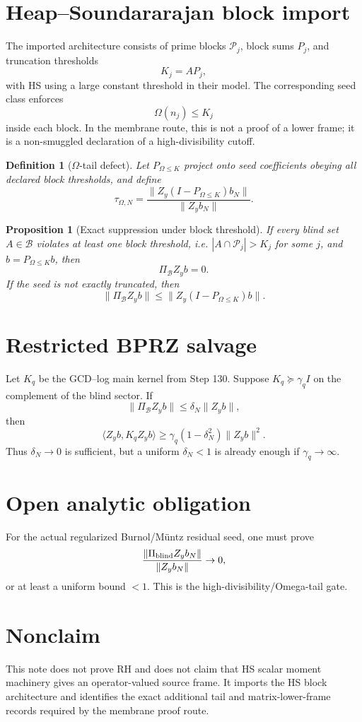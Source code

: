 \documentclass[11pt]{article}
\newtheorem{definition}{Definition}
\newtheorem{proposition}{Proposition}
\begin{document}
\section{Heap--Soundararajan block import}
The imported architecture consists of prime blocks $\mathcal P_j$, block sums $P_j$, and truncation thresholds
\[
  K_j=A P_j,
\]
with HS using a large constant threshold in their model. The corresponding seed class enforces
\[
  \Omega(n_j)\le K_j
\]
inside each block. In the membrane route, this is not a proof of a lower frame; it is a non-smuggled declaration of a high-divisibility cutoff.

\begin{definition}[$\Omega$-tail defect]
Let $P_{\Omega\le K}$ project onto seed coefficients obeying all declared block thresholds, and define
\[
  \tau_{\Omega,N}
  =\frac{\|Z_y(I-P_{\Omega\le K})b_N\|}{\|Z_yb_N\|}.
\]
\end{definition}

\begin{proposition}[Exact suppression under block threshold]
If every blind set $A\in\mathcal B$ violates at least one block threshold, i.e. $|A\cap\mathcal P_j|>K_j$ for some $j$, and $b=P_{\Omega\le K}b$, then
\[
  \Pi_{\mathcal B}Z_yb=0.
\]
If the seed is not exactly truncated, then
\[
  \|\Pi_{\mathcal B}Z_yb\|\le \|Z_y(I-P_{\Omega\le K})b\|.
\]
\end{proposition}

\section{Restricted BPRZ salvage}
Let $K_q$ be the GCD--log main kernel from Step 130. Suppose $K_q\succeq \gamma_q I$ on the complement of the blind sector. If
\[
  \|\Pi_{\mathcal B}Z_yb\|\le \delta_N\|Z_yb\|,
\]
then
\[
  \langle Z_yb,K_qZ_yb\rangle
  \ge \gamma_q(1-\delta_N^2)\|Z_yb\|^2.
\]
Thus $\delta_N\to0$ is sufficient, but a uniform $\delta_N<1$ is already enough if $\gamma_q\to\infty$.

\section{Open analytic obligation}
For the actual regularized Burnol/Müntz residual seed, one must prove
\[
  \frac{\|\Pi_{\rm blind}Z_yb_N\|}{\|Z_yb_N\|}\to0,
\]
or at least a uniform bound $<1$. This is the high-divisibility/Omega-tail gate.

\section{Nonclaim}
This note does not prove RH and does not claim that HS scalar moment machinery gives an operator-valued source frame. It imports the HS block architecture and identifies the exact additional tail and matrix-lower-frame records required by the membrane proof route.
\end{document}
